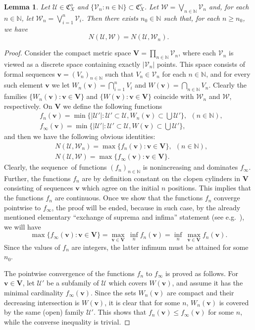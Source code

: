 \documentclass[12pt]{amsart}
\newtheorem{lemma}[theorem]{Lemma}
\theoremstyle{definition}
\numberwithin{equation}{section}
\newcommand{\CU}{\mathcal{U}}
\newcommand{\CW}{\mathcal{W}}
\newcommand{\GC}{\mathfrak{C}}
\def \N {\mathbb N}
\def \sq {sequence}
\def \N {\mathbb N}
\def \CU {\mathcal U}
\def \sq {sequence}
\begin{document}
\begin{lemma} \label{1306140805}
Let $\CU\in \GC_X^o$ and $\{\mathcal{V}_n: n\in \mathbb{N}\}\subset \GC_X^c$. Let $\CW=\bigvee_{n\in\N}\mathcal V_n$ and, for each $n\in\N$, let $\CW_n=\bigvee_{i=1}^n\mathcal V_i$. Then there exists $n_0\in \mathbb{N}$ such that,
for each $n\ge n_0$, we have
$$
N(\CU,\CW)=N(\CU,\CW_n).
$$
\end{lemma}
\begin{proof}
Consider the compact metric space $\mathbf{V}=\prod_{n\in \mathbb{N}} \mathcal{V}_n$, where each $\mathcal{V}_n$ is viewed as a discrete space containing exactly $|\mathcal{V}_n|$ points. 
This space consists of formal \sq s $\mathbf v=(V_n)_{n\in\N}$ such that $V_n\in\mathcal V_n$ for each $n\in\N$, and for every such element $\mathbf v$ we let $W_n(\mathbf v)= \bigcap_{i=1}^n V_i$ and $W(\mathbf v)= \bigcap_{n\in\N} V_n$. Clearly the families
$\{W_n(\mathbf v):\mathbf v\in\mathbf V\}$ and $\{W(\mathbf v):\mathbf v\in\mathbf V\}$ coincide with $\CW_n$ and $\CW$, respectively. On $\mathbf V$ we define the following functions
\begin{align*}
&f_n(\mathbf v) = \min\{|\CU'|:\CU'\subset\CU, W_n(\mathbf v)\subset\bigcup\CU'\}, \ \ (n\in\N),\\
&f_\infty(\mathbf v) = \min\{|\CU'|:\CU'\subset\CU, W(\mathbf v)\subset\bigcup\CU'\},
\end{align*}
and then we have the following obvious identities:
\begin{align*}
&N(\CU,\CW_n)=\max\{f_n(\mathbf v):\mathbf v\in\mathbf V\}, \ \ (n\in\N),\\ 
&N(\CU,\CW) = \max\{f_\infty(\mathbf v):\mathbf v\in\mathbf V\}. 
\end{align*}
Clearly, the \sq\ of functions $(f_n)_{n\in\N}$ is nonincreasing and dominates $f_{\infty}$. Further, the functions $f_n$ are by definition constant on the clopen cylinders in $\mathbf V$ consisting of \sq s $\mathbf v$ which agree on the initial $n$ positions. This implies that the functions $f_n$ are continuous. Once we show that the functions $f_n$ converge pointwise to $f_\infty$, the proof will be ended, because in such case, by the already mentioned elementary ``exchange of suprema and infima'' statement (see e.g.\ \cite[Proposition 2.4 ]{BD}), we will have 
$$
\max\{f_\infty(\mathbf v):\mathbf v\in\mathbf V\}=\max_{\mathbf v\in\mathbf V}\ \inf_n f_n(\mathbf v) = \inf_n\ \max_{\mathbf v\in\mathbf V}f_n(\mathbf v).
$$
Since the values of $f_n$ are integers, the latter infimum must be attained for some $n_0$.

The pointwise convergence of the functions $f_n$ to $f_\infty$ is proved as follows. For $\mathbf v\in\mathbf V$, let $\CU'$ be a subfamily of $\CU$ which covers $W(\mathbf v)$, and assume it has the minimal cardinality $f_\infty (\mathbf v)$. Since the sets
$W_n(\mathbf v)$ are compact and their decreasing intersection is $W(\mathbf v)$, it is clear that for some $n$, $W_n(\mathbf v)$ is covered by the same (open) family $\CU'$. This shows that $f_n(\mathbf v) \le f_\infty(\mathbf v)$ for some $n$, while the converse inequality is trivial. 
\end{proof}
\end{document}
